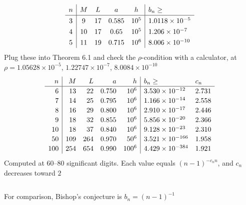 \begin{columns}[5 6]
$$\def\arraystretch{1.3}\begin{array}{c|cccc|l}n&M&L&a&h&b_n\geq\\\hline3&9&17&0.585&10^5&1.0118\times10^{-5}\\4&10&17&0.65&10^5&1.206\times10^{-7}\\5&11&19&0.715&10^6&8.006\times10^{-10}\end{array}$$
Plug these into Theorem 6.1 and check the $\rho$-condition with a calculator, at $\rho=1.05628\times10^{-5}$, $1.22747\times10^{-7}$, $8.0084\times10^{-10}$
\columnbreak
{}
$$\def\arraystretch{1.15}\begin{array}{r|rrrr|ll}n&M&L&a&h&b_n\geq&c_n\\\hline6&13&22&0.750&10^6&3.530\times10^{-12}&2.731\\7&14&25&0.795&10^6&1.166\times10^{-14}&2.558\\8&16&29&0.800&10^6&2.910\times10^{-17}&2.446\\9&18&32&0.855&10^6&5.856\times10^{-20}&2.366\\10&18&37&0.840&10^6&9.128\times10^{-23}&2.310\\50&109&264&0.970&50^6&3.521\times10^{-166}&1.958\\100&254&654&0.990&100^6&4.429\times10^{-384}&1.921\end{array}$$
Computed at 60–80 significant digits. Each value equals $(n-1)^{-c_nn}$, and $c_n$ decreases toward $2$
\end{columns}
\begin{center}
For comparison, Bishop's conjecture is $b_n=(n-1)^{-1}$
\end{center}


